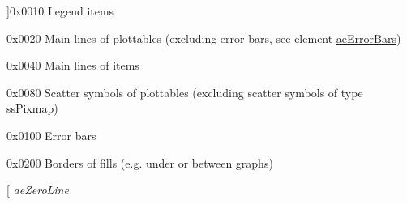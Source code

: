 \begin{Desc}
\begin{description}
{}]{\ttfamily 0x0010} Legend items \item[{\em 
\hypertarget{namespace_q_c_p_ae55dbe315d41fe80f29ba88100843a0ca4145e4251b0cf2dbedabeea0a38f84f6}{ae\-Plottables}\label{namespace_q_c_p_ae55dbe315d41fe80f29ba88100843a0ca4145e4251b0cf2dbedabeea0a38f84f6}
}]{\ttfamily 0x0020} Main lines of plottables (excluding error bars, see element \hyperlink{namespace_q_c_p_ae55dbe315d41fe80f29ba88100843a0ca9dcf3882cb321bb305f71fdc0f09f63d}{ae\-Error\-Bars}) \item[{\em 
\hypertarget{namespace_q_c_p_ae55dbe315d41fe80f29ba88100843a0caf7712a85d6b0c75b24301d2fe9484db3}{ae\-Items}\label{namespace_q_c_p_ae55dbe315d41fe80f29ba88100843a0caf7712a85d6b0c75b24301d2fe9484db3}
}]{\ttfamily 0x0040} Main lines of items \item[{\em 
\hypertarget{namespace_q_c_p_ae55dbe315d41fe80f29ba88100843a0cae45ed8cd167bffe27d7f40da4bc17e9c}{ae\-Scatters}\label{namespace_q_c_p_ae55dbe315d41fe80f29ba88100843a0cae45ed8cd167bffe27d7f40da4bc17e9c}
}]{\ttfamily 0x0080} Scatter symbols of plottables (excluding scatter symbols of type ss\-Pixmap) \item[{\em 
\hypertarget{namespace_q_c_p_ae55dbe315d41fe80f29ba88100843a0ca9dcf3882cb321bb305f71fdc0f09f63d}{ae\-Error\-Bars}\label{namespace_q_c_p_ae55dbe315d41fe80f29ba88100843a0ca9dcf3882cb321bb305f71fdc0f09f63d}
}]{\ttfamily 0x0100} Error bars \item[{\em 
\hypertarget{namespace_q_c_p_ae55dbe315d41fe80f29ba88100843a0ca788810f0aa930137de6ad6cc6d83d354}{ae\-Fills}\label{namespace_q_c_p_ae55dbe315d41fe80f29ba88100843a0ca788810f0aa930137de6ad6cc6d83d354}
}]{\ttfamily 0x0200} Borders of fills (e.\-g. under or between graphs) \item[{\em 
\hypertarget{namespace_q_c_p_ae55dbe315d41fe80f29ba88100843a0ca261f8ea78cf3c9561726223ffa33dc12}{ae\-Zero\-Line}\label{namespace_q_c_p_ae55dbe315d41fe80f29ba88100843a0ca261f8ea78cf3c9561726223ffa33dc12}
}
\end{description}
\end{Desc}
